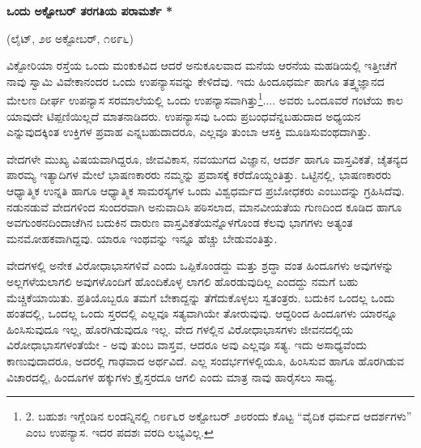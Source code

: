 \begin{center}
\textbf{ಒಂದು ಅಕ್ಟೋಬರ್ ತರಗತಿಯ ಪರಾಮರ್ಶೆ *}
\end{center}

\begin{center}
(ಲೈಟ್, ೨೮ ಅಕ್ಟೋಬರ್, ೧೮೯೬)
\end{center}

ವಿಕ್ಟೋರಿಯಾ ರಸ್ತೆಯ ಒಂದು ಮಂಕುಕವಿದ ಆದರೆ ಅನುಕೂಲವಾದ ಮನೆಯ ಆರನೆಯ ಮಹಡಿಯಲ್ಲಿ ಇತ್ತೀಚೆಗೆ ನಾವು ಸ್ವಾಮಿ ವಿವೇಕಾನಂದರ ಒಂದು ಉಪನ್ಯಾಸವನ್ನು ಕೇಳಿದೆವು. ಇದು ಹಿಂದೂಧರ್ಮ ಹಾಗೂ ತತ್ತ್ವಜ್ಞಾನದ ಮೇಲಣ ದೀರ್ಘ ಉಪನ್ಯಾಸ ಸರಮಾಲೆಯಲ್ಲಿ ಒಂದು ಉಪನ್ಯಾಸವಾಗಿತ್ತು\footnote{2. ಬಹುಶಃ ಇಗ್ಲೆಂಡಿನ ಲಂಡನ್ನಿನಲ್ಲಿ ೧೮೯೬ರ ಅಕ್ಟೋಬರ್ ೨೮ರಂದು ಕೊಟ್ಟ “ವೈದಿಕ ಧರ್ಮದ ಆದರ್ಶಗಳು” ಎಂಬ ಉಪನ್ಯಾಸ. ಇದರ ಪದಶಃ ವರದಿ ಲಭ್ಯವಿಲ್ಲ.}.... ಅವರು ಒಂದೂವರೆ ಗಂಟೆಯ ಕಾಲ ಯಾವುದೇ ಟಿಪ್ಪಣಿಯಿಲ್ಲದೆ ಮಾತನಾಡಿದರು. ಉಪನ್ಯಾಸವು ಒಂದು ಪ್ರಬಂಧವೆನ್ನಬಹುದಾದ ಅಧ್ಯಯನ ಎನ್ನುವುದಕ್ಕಿಂತ ಉಕ್ತಿಗಳ ಪ್ರವಾಹ ಎನ್ನಬಹುದಾದರೂ, ಎಲ್ಲವೂ ತುಂಬಾ ಆಸಕ್ತಿ ಮೂಡಿಸುವಂಥದಾಗಿತ್ತು.

ವೇದಗಳೇ ಮುಖ್ಯ ವಿಷಯವಾಗಿದ್ದರೂ, ಜೀವವಿಕಾಸ, ನವಯುಗದ ವಿಜ್ಞಾನ, ಆದರ್ಶ ಹಾಗೂ ವಾಸ್ತವಿಕತೆ, ಚೈತನ್ಯದ ಪಾರಮ್ಯ ಇತ್ಯಾದಿಗಳ ಮೇಲೆ ಭಾಷಣಕಾರರು ನಮ್ಮನ್ನು ಪ್ರವಾಸಕ್ಕೆ ಕರೆದೊಯ್ದಂತಿತ್ತು. ಒಟ್ಟಿನಲ್ಲಿ, ಭಾಷಣಕಾರರು ಆಧ್ಯಾತ್ಮಿಕ ಉನ್ನತಿ ಹಾಗೂ ಆಧ್ಯಾತ್ಮಿಕ ಸಾಮರಸ್ಯಗಳ ಒಂದು ವಿಶ್ವಧರ್ಮದ ಪ್ರಬೋಧಕರು ಎಂಬುದನ್ನು ಗ್ರಹಿಸಿದೆವು. ನಡುನಡುವೆ ವೇದಗಳಿಂದ ಸುಂದರವಾಗಿ ಅನುವಾದಿಸಿ ಪಠಿಸಲಾದ, ಮಾನವೀಯತೆಯ ಗುಣದಿಂದ ಕೂಡಿದ ಹಾಗೂ ಅವಗುಂಠನದಿಂದಾಚೆಗಿನ ಬದುಕಿನ ದಾರುಣ ವಾಸ್ತವಿಕತೆಯನ್ನೊಳಗೊಂಡ ಕೆಲವು ಭಾಗಗಳು ಅತ್ಯಂತ ಮನಮೋಹಕವಾಗಿದ್ದವು. ಯಾರೂ ಇಂಥವನ್ನು ಇನ್ನೂ ಹೆಚ್ಚು ಬೇಡುವಂತಿತ್ತು.

ವೇದಗಳಲ್ಲಿ ಅನೇಕ ವಿರೋಧಾಭಾಸಗಳಿವೆ ಎಂದು ಒಪ್ಪಿಕೊಂಡದ್ದು ಮತ್ತು ಶ್ರದ್ಧಾ ವಂತ ಹಿಂದೂಗಳು ಅವುಗಳನ್ನು ಅಲ್ಲಗಳೆಯಲಾಗಲಿ ಅವುಗಳೊಂದಿಗೆ ಹೊಂದಿಕೊಳ್ಳ ಲಾಗಲಿ ಹೊರಡುವುದಿಲ್ಲ ಎಂದದ್ದು ನಮಗೆ ಬಹು ಮೆಚ್ಚಿಕೆಯಾಯಿತು. ಪ್ರತಿಯೊಬ್ಬರೂ ತಮಗೆ ಬೇಕಾದ್ದನ್ನು ತೆಗೆದುಕೊಳ್ಳಲು ಸ್ವತಂತ್ರರು. ಬದುಕಿನ ಒಂದಲ್ಲ ಒಂದು ಹಂತದಲ್ಲಿ, ಒಂದಲ್ಲ ಒಂದು ಸ್ತರದಲ್ಲಿ ಎಲ್ಲವೂ ಸತ್ಯವಾಗಿಯೇ ತೋರುವುವು. ಆದ್ದರಿಂದ ಹಿಂದೂಗಳು ಯಾರನ್ನೂ ಹಿಂಸಿಸುವುದೂ ಇಲ್ಲ, ಹೊರಗಿಡುವುದೂ ಇಲ್ಲ. ವೇದ ಗಳಲ್ಲಿನ ವಿರೋಧಾಭಾಸಗಳು ಜೀವನದಲ್ಲಿಯ ವಿರೋಧಾಭಾಸಗಳಂತೆಯೇ - ಅವು ತುಂಬ ವಾಸ್ತವ, ಆದರೂ ಅವು ಎಲ್ಲವೂ ಸತ್ಯ. ಇದು ಅಸಾಧ್ಯವೆಂದು ಕಾಣುವುದಾದರೂ, ಅದರಲ್ಲಿ ಗಾಢವಾದ ಅರ್ಥವಿದೆ. ಎಲ್ಲ ಸಂದರ್ಭಗಳಲ್ಲಿಯೂ, ಹಿಂಸಿಸುವ ಹಾಗೂ ಹೊರಗಿಡುವ ವಿಚಾರದಲ್ಲಿ, ಹಿಂದೂಗಳ ಹಕ್ಕುಗಳು ಕ್ರೈಸ್ತರದೂ ಆಗಲಿ ಎಂದು ಮಾತ್ರ ನಾವು ಹಾರೈಸಲು ಸಾಧ್ಯ.

